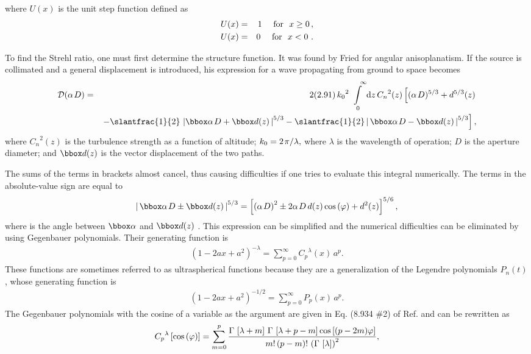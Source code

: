 where
$U\left(  x \right)$  is the unit step function defined as
\begin{eqnarray} U( x )&=&1\,\,\,\,\,\,\,\,{\rm for}\,\,\,\,x\ge
0\,,  \nonumber \\   U( x )&=&0\,\,\,\,\,\,\,\,{\rm
for}\,\,\,\,x<0\,\,.    \end{eqnarray}

To find  the Strehl ratio, one must first determine the structure
function.  It  was found by Fried\cite{4}  for angular
anisoplanatism.  If the source  is collimated and a general
displacement is introduced, his expression  for a wave propagating
from ground to space becomes
\begin{eqnarray}
{\cal D}({\alpha
\kern 1ptD} )&=& 2(2.91)\,{k_0}^2\int\limits_{\,\,\; 0}^{\,\,\,\,\,\;
\infty}   {\rm d}z\,{C_n}^2(z)\left[ {( {\alpha \kern 1ptD}  )^{5/
3}+d^{5/ 3}(z)}\right.  \nonumber\\
&&\left.
{-{\slantfrac{1}{2}}\,\left| {{\bbox \alpha} \kern 1ptD+{\bbox
d}(z)\,} \right|^{5/ 3} -{\textstyle \slantfrac{1}{2}}\left|
{\,{\bbox \alpha}  \kern 1ptD-{\bbox d}(z)\,} \right|^{5 / 3}}
\right],
\end{eqnarray}
where  ${C_n}^2(z)$  is the turbulence
strength as a function of altitude;  $k_0=2\kern 1pt\pi / \lambda
,$  where $\lambda $ is the wavelength  of operation; $D$ is the
aperture diameter; and  ${\bbox d}(z)$   is the vector displacement
of the two paths.

The sums of the terms in  brackets almost cancel, thus causing
difficulties if one tries to  evaluate this integral numerically.
The terms in the absolute-value  sign are equal to
\begin{eqnarray}\left| {\,{\bbox \alpha}  \kern 1ptD\pm {\bbox
d}(z)\,} \right|^{5/ 3}=\left[ {\left( {\alpha \kern  1ptD}
\right)^2\pm 2\alpha \kern 1ptD\,d(z)\cos \left( \varphi
\right)+d^2(z)} \right]^{5/ 6},\end{eqnarray}  where  is the angle
between  ${\bbox \alpha} $  and  ${\bbox d}( z )$ .    This
expression can be simplified and  the numerical difficulties can be
eliminated by using Gegenbauer  polynomials.\cite{8}  Their
generating function is  \begin{eqnarray}\left( {1-2ax+a^2}
\right)^{-\lambda }=\sum\limits_{p=0}^\infty  {{C_p}^\lambda
(x)\,a^p}. \end{eqnarray}   These functions are sometimes referred
to as ultraspherical functions because they are a generalization of
the Legendre polynomials  $P_n(t)$ , whose generating function is
\begin{eqnarray}\left( {1- 2ax+a^2} \right)^{-1/
2}=\sum\limits_{p=0}^\infty  {P_p(x)\,a^p}.\end{eqnarray}      The
Gegenbauer polynomials with the cosine of a variable as the
argument are given in Eq. (8.934  \#2) of Ref.   and
can be rewritten as  \begin{eqnarray}{C_p}^\lambda \left[ {\cos
\left( \varphi   \right)} \right]=\sum\limits_{m=0}^p
{}{{\Gamma\,\left[ {\lambda +m}  \right]\,\Gamma\,\left[ {\lambda
+p-m} \right]\cos \left[ {(p-2m)\varphi }  \right]} \over
{m!\,(p-m)!\,\left( {\Gamma\,\left[ \lambda  \right]}
\right)^2}},\end{eqnarray}

